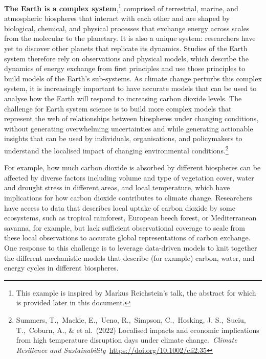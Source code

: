 \textbf{The Earth is a complex system},\footnote{This example is
  inspired by Markus Reichstein's talk, the abstract for which is
  provided later in this document.} comprised of terrestrial, marine,
and atmospheric biospheres that interact with each other and are shaped
by biological, chemical, and physical processes that exchange energy
across scales from the molecular to the planetary. It is also a unique
system: researchers have yet to discover other planets that replicate
its dynamics. Studies of the Earth system therefore rely on observations
and physical models, which describe the dynamics of energy exchange from
first principles and use those principles to build models of the Earth's
sub-systems. As climate change perturbs this complex system, it is
increasingly important to have accurate models that can be used to
analyse how the Earth will respond to increasing carbon dioxide levels.
The challenge for Earth system science is to build more complex models
that represent the web of relationships between biospheres under
changing conditions, without generating overwhelming uncertainties and
while generating actionable insights that can be used by individuals,
organisations, and policymakers to understand the localised impact of
changing environmental conditions.\footnote{Summers, T.,~Mackie,
  E.,~Ueno, R.,~Simpson, C.,~Hosking, J. S.,~Suciu, T.,~Coburn, A., \&
  et al.~(2022) Localised impacts and economic implications from high
  temperature disruption days under climate change.~\emph{Climate
  Resilience and Sustainability~}\url{https://doi.org/10.1002/cli2.35}}

For example, how much carbon dioxide is absorbed by different biospheres
can be affected by diverse factors including volume and type of
vegetation cover, water and drought stress in different areas, and local
temperature, which have implications for how carbon dioxide contributes
to climate change. Researchers have access to data that describes local
uptake of carbon dioxide by some ecosystems, such as tropical
rainforest, European beech forest, or Mediterranean savanna, for
example, but lack sufficient observational coverage to scale from these
local observations to accurate global representations of carbon
exchange. One response to this challenge is to leverage data-driven
models to knit together the different mechanistic models that describe
(for example) carbon, water, and energy cycles in different biospheres.

